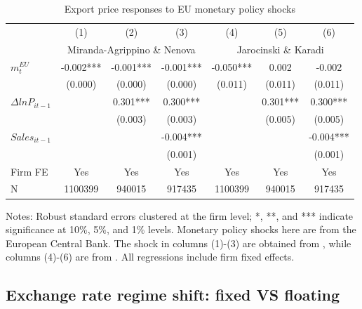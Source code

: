 \begin{table}[htbp]
    \centering
    \caption{Export price responses to EU monetary policy shocks}
    \begin{threeparttable}
    \begin{tabular}{lcccccc}
        \toprule
        & (1)   & (2)   & (3)   & (4)   & (5)   & (6) \\
        & \multicolumn{3}{c}{Miranda-Agrippino \& Nenova} & \multicolumn{3}{c}{Jarocinski \& Karadi}  \\
        \midrule
        $m^{EU}_t$ & -0.002*** & -0.001*** & -0.001*** & -0.050*** & 0.002 & -0.002 \\
              & (0.000) & (0.000) & (0.000) & (0.011) & (0.011) & (0.011)\\  
        $\Delta ln P_{it-1}$ &       & 0.301*** & 0.300*** &       & 0.301*** & 0.300*** \\
              &       & (0.003) & (0.003) &       & (0.005) & (0.005) \\
        $Sales_{it-1}$ &       &       & -0.004*** &       &       & -0.004*** \\
              &       &       & (0.001) &       &       & (0.001) \\
        \midrule
        Firm FE & Yes   & Yes   & Yes   & Yes   & Yes   & Yes \\
         N     & 1100399 & 940015 & 917435 & 1100399 & 940015 & 917435 \\
        \bottomrule
    \end{tabular}
    \begin{tablenotes}
        \footnotesize
        \item Notes: Robust standard errors clustered at the firm level;  *, **, and *** indicate significance at 10\%, 5\%, and 1\% levels. Monetary policy shocks here are from the European Central Bank. The shock in columns (1)-(3) are obtained from \cite{miranda2022tale}, while columns (4)-(6) are  from \cite{jarocinski2020deconstructing}. All regressions include firm fixed effects.
    \end{tablenotes}
    \end{threeparttable}
    \label{tab.EU}
\end{table}

\subsection{Exchange rate regime shift: fixed VS floating}

